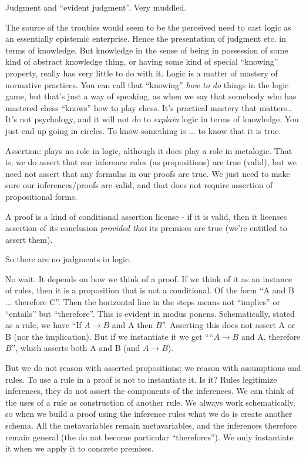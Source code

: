 Judgment and ``evident judgment''. Very muddled.

The source of the troubles would seem to be the perceived need to cast
logic as an essentially epistemic enterprise. Hence the presentation
of judgment etc. in terms of knowledge. But knowledge in the sense of
being in possession of some kind of abstract knowledge thing, or
having some kind of special ``knowing'' property, really has very
little to do with it. Logic is a matter of mastery of normative
practices. You can call that ``knowing'' \textit{how to do} things in
the logic game, but that's just a way of speaking, as when we say that
somebody who has mastered chess ``knows'' how to play chess. It's
practical mastery that matters.. It's not psychology, and it will not
do to \textit{explain} logic in terms of knowledge. You just end up
going in circles. To know something is ... to know that it is true.

Assertion: plays no role in logic, although it does play a role in
metalogic. That is, we do assert that our inference rules (as
propositions) are true (valid), but we need not assert that any
formulas in our proofs are true. We just need to make sure our
inferences/proofs are valid, and that does not require assertion of
propositional forms.

A proof is a kind of conditional assertion license - if it is valid,
then it licenses assertion of its conclusion \textit{provided that}
its premises are true (we're entitled to assert them).

So there are no judgments in logic.

No wait. It depends on how we think of a proof. If we think of it as
an instance of rules, then it is a proposition that is not a
conditional. Of the form ``A and B ... therefore C''. Then the
horizontal line in the steps means not ``implies'' or ``entails'' but
``therefore''. This is evident in modus ponens. Schematically, stated
as a rule, we have ``If \(A\rightarrow B\) and A then \(B\)''.
Asserting this does not assert A or B (nor the implication). But if we
instantiate it we get ````\(A\rightarrow B\) and A, therefore \(B\)'',
which asserts both A and B (and \(A\rightarrow B\)).

But we do not reason with asserted propositions; we reason with
assumptions and rules. To use a rule in a proof is not to instantiate
it. Is it? Rules legitimize inferences, they do not assert the
components of the inferences. We can think of the uses of a rule as
construction of another rule. We always work schematically, so when we
build a proof using the inference rules what we do is create another
schema. All the metavariables remain metavariables, and the inferences
therefore remain general (the do not become particular
``therefores''). We only instantiate it when we apply it to concrete
premises.

